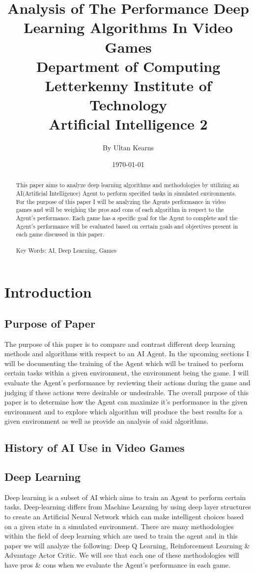 \documentclass[conference]{IEEEtran}
\title{
Analysis of The Performance Deep Learning Algorithms In Video Games\\
\vspace{5mm}
\large Department of Computing \\
\vspace{3mm} 
\large Letterkenny Institute of Technology \\
\vspace{3mm} 
\large Artificial Intelligence 2
}
\author{By Ultan Kearns}
\date{\today}
\begin{document}
\maketitle
\begin{abstract}
    This paper aims to analyze deep learning algorithms and methodologies by utilizing an AI(Artificial Intelligence) Agent to perform specified tasks in simulated environments.  For the purpose of this paper I will be analyzing the Agents performance in video games and will be weighing the pros and cons of each algorithm in respect to the Agent's performance.  Each game has a specific goal for the Agent to complete and the Agent's performance will be evaluated based on certain goals and objectives present in each game discussed in this paper. 
    \\
    \\
    Key Words: AI, Deep Learning, Games
\end{abstract}
\section{Introduction}
\subsection{Purpose of Paper}
The purpose of this paper is to compare and contrast different deep learning methods and algorithms with respect to an AI Agent.  In the upcoming sections I will be documenting the training of the Agent which will be trained to perform certain tasks within a given environment, the environment being the game.  I will evaluate the Agent's performance by reviewing their actions during the game and judging if these actions were desirable or undesirable.  The overall purpose of this paper is to determine how the Agent can maximize it's performance in the given environment and to explore which algorithm will produce the best results for a given environment as well as provide an analysis of said algorithms.
\subsection{History of AI Use in Video Games}

\subsection{Deep Learning}
Deep learning is a subset of AI which aims to train an Agent to perform certain tasks.  Deep-learning differs from Machine Learning by using deep layer structures to create an Artificial Neural Network which can make intelligent choices based on a given state in a simulated environment.  There are many methodologies within the field of deep learning which are used to train the agent and in this paper we will analyze the following: Deep Q Learning, Reinforcement Learning \& Advantage Actor Critic.  We will see that each one of these methodologies will have pros \& cons when we evaluate the Agent's performance in each game.
\end{document}
